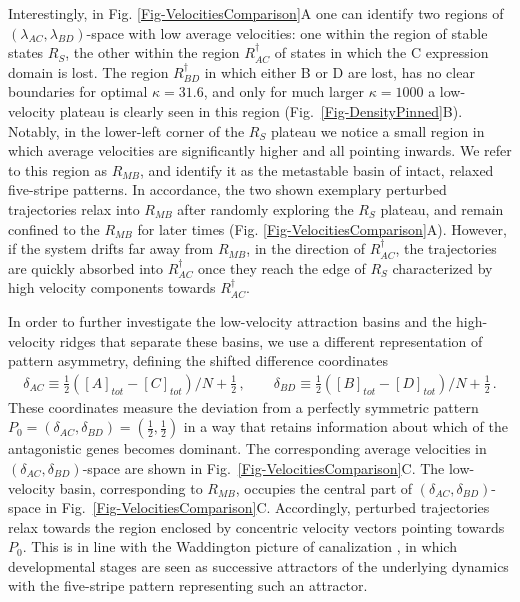 \documentclass[a4paper,10pt]{article}
\newcommand{\GA}{A\xspace}
\newcommand{\GB}{B\xspace}
\newcommand{\GC}{C\xspace}
\newcommand{\GD}{D\xspace}
\begin{document}
Interestingly, in Fig. \ref{Fig-VelocitiesComparison}A one can identify two regions of $(\lambda_{AC},\lambda_{BD})$-space with low average velocities: 
one within the region of stable states $R_S$, the other within the region $R^\dagger_{AC}$ of states in which the \GC expression domain is lost. The region $R^\dagger_{BD}$ in which either \GB or \GD are lost, has no clear boundaries for optimal $\kappa=31.6$, and only for much larger $\kappa=1000$ a low-velocity plateau is clearly seen in this region (Fig.~\ref{Fig-DensityPinned}B).
Notably, in the lower-left corner of the $R_S$ plateau we notice a small region in which average velocities are significantly higher and all pointing inwards. We refer to this region as $R_{MB}$, and identify it as the metastable basin of intact, relaxed five-stripe patterns. In accordance, the two shown exemplary perturbed trajectories relax into $R_{MB}$ after randomly exploring the $R_S$ plateau, and remain confined to the $R_{MB}$ for later times (Fig. \ref{Fig-VelocitiesComparison}A). However, if the system drifts far away from $R_{MB}$, in the direction of $R^\dagger_{AC}$, the trajectories are quickly absorbed into $R^\dagger_{AC}$ once they reach the edge of $R_S$ characterized by high velocity components towards $R^\dagger_{AC}$.

In order to further investigate the low-velocity attraction basins and the high-velocity ridges that separate these basins, we use a different representation of pattern asymmetry, defining the shifted difference coordinates 
\begin{align}
\delta_{AC} \equiv \frac{1}{2}([\GA]_{tot} - [\GC]_{tot})/N + \frac{1}{2} \,, \qquad
\delta_{BD} \equiv \frac{1}{2}([\GB]_{tot} - [\GD]_{tot})/N + \frac{1}{2} \,.
\label{eq:deltaACBD}
\end{align}
These coordinates measure the deviation from a perfectly symmetric pattern $P_0=(\delta_{AC},\delta_{BD})=(\frac{1}{2},\frac{1}{2})$ in a way that retains information about which of the antagonistic genes becomes dominant. The corresponding average velocities in $(\delta_{AC},\delta_{BD})$-space are shown in Fig.~\ref{Fig-VelocitiesComparison}C. The low-velocity basin, corresponding to $R_{MB}$, occupies the central part of $(\delta_{AC},\delta_{BD})$-space in Fig.~\ref{Fig-VelocitiesComparison}C.
Accordingly, perturbed trajectories relax towards the region enclosed by concentric velocity vectors pointing towards $P_0$. This is in line with the Waddington picture of canalization \cite{Waddington1942, Waddington1959}, in which developmental stages are seen as successive attractors of the underlying dynamics with the five-stripe pattern representing such an attractor.
\end{document}

